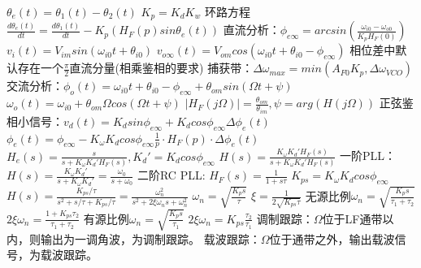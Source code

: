 \documentclass[10.5pt,landscape]{article}
\begin{document}
\begin{multicols*}{4}
  $\theta_e(t) = \theta_1(t) - \theta_2(t)$ $K_p = K_dK_w$ \newline
  环路方程$\frac{d\theta_e(t)}{dt} = \frac{d\theta_1(t)}{dt} - K_p(H_F(p)sin \theta_e(t))$ \newline
  直流分析：$\phi_{e \infty} = arcsin(\frac{\omega_{i0} - \omega_{o0}}{K_pH_F(0)})$ \newline
  $v_i(t) = V_{im}sin(\omega_{i0}t + \theta_{i0})$\newline
  $v_{o\infty}(t) = V_{om} cos(\omega_{i0}t + \theta_{i0} - \phi_{e\infty})$ \newline
  相位差中默认存在一个$\frac{\pi}{2}$直流分量(相乘鉴相的要求) \newline
  捕获带：$\Delta \omega_{max} = min(A_{F0}K_p, \Delta \omega_{VCO})$ \newline
  交流分析：$\phi_o(t) = \omega_{i0}t + \theta_{i0} - \phi_{e \infty} + \theta_{om}sin(\Omega t + \psi)$ \newline
  $\omega_o(t) = \omega_{i0} + \theta_{om}\Omega cos(\Omega t + \psi)$ \newline
  $| H_F(j\Omega)| = \frac{\theta_{om}}{\theta_{im}}, \psi = arg(H(j\Omega))$ \newline
  正弦鉴相小信号：$v_d(t) = K_d sin\phi_{e \infty} + K_d cos \phi_{e \infty}  \Delta \phi_e(t)$ \newline
  $\phi_e(t) = \phi_{e \infty} - K_\omega K_d cos \phi_{e \infty} \frac{1}{p} \cdot  H_F(p) \cdot  \Delta \phi_e(t)$ \newline
  $H_e(s) = \frac{s}{s + K_\omega K_d' H_F(s)}, K_d' = K_d cos\phi_{e \infty}$ \newline
  $H(s) = \frac{K_\omega K_d' H_F(s)}{s + K_\omega K_d' H_F(s)}$ \newline
  一阶PLL：$H(s) = \frac{K_\omega K_d'}{s + K_\omega K_d'} = \frac{\omega_0}{s + \omega_0}$ \newline
  二阶RC PLL: $H_F(s) = \frac{1}{1 + s\tau}$ $K_{ps} =  K_\omega K_d cos\phi_{e \infty}$ \newline
  $H(s) = \frac{K_{ps} / \tau}{s^2 + s / \tau + K_{ps}/\tau} = \frac{\omega_n^2}{s^2 + 2\xi\omega_ns + \omega_n^2}$ \newline
  $\omega_n = \sqrt{\frac{K_ps}{\tau}}$ $\xi = \frac{1}{2\sqrt{K_{ps}\tau}}$ \newline
  无源比例$\omega_n = \sqrt{\frac{K_ps}{\tau_1 + \tau_2}}$ $2\xi\omega_n = \frac{1 + K_{ps}\tau_2}{\tau_1 + \tau_2}$ \newline
  有源比例$\omega_n = \sqrt{\frac{K_ps}{\tau_1}}$ $2\xi\omega_n = K_{ps}\frac{\tau_2}{\tau_1}$ \newline
  调制跟踪：$\Omega$位于LF通带以内，则输出为一调角波，为调制跟踪。\newline
  载波跟踪：$\Omega$位于通带之外，输出载波信号，为载波跟踪。 \newline
  

\end{multicols*}
\end{document}
